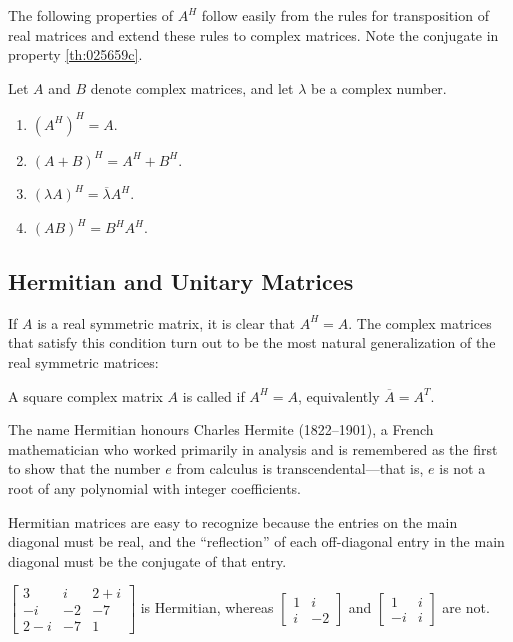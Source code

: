 \documentclass{ximera}
\begin{document}
The following properties of $A^{H}$ follow easily from the rules for transposition of real matrices and extend these rules to complex matrices. Note the conjugate in property \ref{th:025659c}.


\begin{theorem}\label{th:025659}
Let $A$ and $B$ denote complex matrices, and let $\lambda$ be a complex number.

\begin{enumerate}
\item\label{th:025659a} $(A^{H})^{H} = A$.

\item\label{th:025659b} $(A + B)^{H} = A^{H} + B^{H}$.

\item\label{th:025659c} $(\lambda A)^H = \overline{\lambda}A^H$.

\item\label{th:025659d} $(AB)^{H} = B^{H}A^{H}$.

\end{enumerate}
\end{theorem}

\subsection*{Hermitian and Unitary Matrices}


If $A$ is a real symmetric matrix, it is clear that $A^{H} = A$. The complex matrices that satisfy this condition turn out to be the
most natural generalization of the real symmetric matrices:

\begin{definition}\label{def:Hermitian}
A square complex matrix $A$ is called  if $A^{H} = A$, equivalently $\overline{A} = A^T$.
\end{definition}
\begin{remark}
The name Hermitian honours Charles Hermite (1822--1901), a French
mathematician who worked primarily in analysis and is remembered as the
first to show that the number $e$ from calculus is transcendental---that is, $e$ is not a root of any polynomial with integer coefficients.
\end{remark}

Hermitian matrices are easy to
recognize because the entries on the main diagonal must be real, and the
 ``reflection'' of each off-diagonal entry in the main diagonal must be the
 conjugate of that entry.

\begin{example}\label{ex:025690}
$\left[ \begin{array}{ccc}
3 & i & 2 + i \\
-i & -2 & -7 \\
2 - i & -7 & 1
\end{array}\right]$
 is Hermitian, whereas $\left[ \begin{array}{rr}
 1 & i \\
 i & -2
 \end{array}\right]$ and $\left[ \begin{array}{rr}
 1 & i \\
 -i & i
 \end{array}\right]$ are not.
\end{example}
\end{document}
